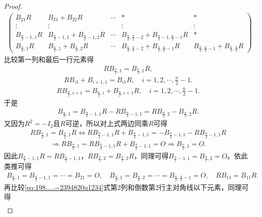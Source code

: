 \documentclass[../../main.tex]{subfiles}
\begin{document}
\begin{proof}
\begin{align}
\begin{pmatrix}
B_{21}R & B_{21} + B_{22}R & \cdots & * & * \\
\vdots & \vdots &  & \vdots & \vdots \\
B_{\frac{n}{2}-1,1}R & B_{\frac{n}{2}-1,1} + B_{\frac{n}{2}-1,2}R & \cdots & B_{\frac{n}{2},\frac{n}{2}-2} + B_{\frac{n}{2}-1,\frac{n}{2}-1}R & * \\
B_{\frac{n}{2},1}R & B_{\frac{n}{2},1} + B_{\frac{n}{2},2}R & \cdots & B_{\frac{n}{2},\frac{n}{2}-2} + B_{\frac{n}{2},\frac{n}{2}-1}R & B_{\frac{n}{2},\frac{n}{2}-1} + B_{\frac{n}{2},\frac{n}{2}}R
\end{pmatrix} \label{eq:198.....--2394820u1234}
\end{align}
比较第一列和最后一行元素得
\begin{align*}
RB_{\frac{n}{2},1} = B_{\frac{n}{2},1}R,
\end{align*}
\begin{align*}
RB_{i1} + B_{i+1,1} = B_{i1}R, \quad i = 1,2,\cdots,\frac{n}{2}-1.
\end{align*}
\begin{align*}
RB_{\frac{n}{2},i+1} = B_{\frac{n}{2},i} + B_{\frac{n}{2},i+1}R, \quad i = 1,2,\cdots,\frac{n}{2}-1.
\end{align*}
于是
\begin{align*}
B_{\frac{n}{2},1} = B_{\frac{n}{2}-1,1}R - RB_{\frac{n}{2}-1,1} = RB_{\frac{n}{2},2} - B_{\frac{n}{2},2}R.
\end{align*}
又因为\(R^2 = -I_2\)且\(R\)可逆，所以对上式两边同乘$R$可得
\begin{align*}
RB_{\frac{n}{2},1} = B_{\frac{n}{2},1}R \Longleftrightarrow RB_{\frac{n}{2}-1,1}R + B_{\frac{n}{2}-1,1} = -B_{\frac{n}{2}-1,1} - RB_{\frac{n}{2}-1,1}R
\end{align*}
\begin{align*}
\Longrightarrow RB_{\frac{n}{2},1} = RB_{\frac{n}{2}-1,1}R + B_{\frac{n}{2}-1,1} = O \Longrightarrow B_{\frac{n}{2},1} = O.
\end{align*}
因此\(B_{\frac{n}{2}-1,1}R = RB_{\frac{n}{2}-1,1}\)，\(RB_{\frac{n}{2},2} = B_{\frac{n}{2},2}R\)，同理可得\(B_{\frac{n}{2}-1,1} = B_{\frac{n}{2},2} = O\)。依此类推可得
\begin{align*}
B_{\frac{n}{2},1} = B_{\frac{n}{2}-1,1} = \cdots = B_{21} = O, \quad B_{\frac{n}{2},1} = B_{\frac{n}{2},2} = \cdots = B_{\frac{n}{2},\frac{n}{2}-1} = O, \quad RB_{11} = B_{11}R.
\end{align*}
再比较\eqref{eq:198.....--2394820u1234}式第2列和倒数第2行主对角线以下元素，同理可得
\begin{align*}

\end{align*}
\end{proof}
\end{document}
